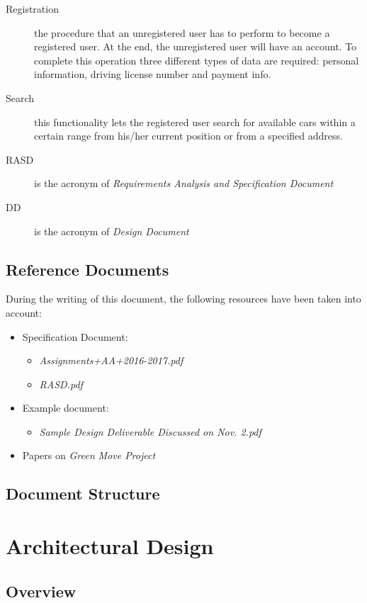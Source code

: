 \documentclass[11pt,a4paper]{report}
\begin{document}
\begin{description}
\item[Registration] the procedure that an unregistered user has to perform to become a registered user. At the end, the unregistered user will have an account. To complete this operation three different types of data are required: personal information, driving license number and payment info.
\item[Search] this functionality lets the registered user search for available cars within a certain range from his/her current position or from a specified address.
\item[RASD] is the acronym of \textit{Requirements Analysis and Specification Document}
\item[DD] is the acronym of \textit{Design Document}
\end{description}

\section{Reference Documents}
During the writing of this document, the following resources have been taken into account:
\begin{itemize}
	\item Specification Document:
	\begin{itemize}
		\item \textit{Assignments+AA+2016-2017.pdf}
		\item \textit{RASD.pdf}
	\end{itemize}
	\item Example document:
	\begin{itemize}
		\item \textit{Sample Design Deliverable Discussed on Nov. 2.pdf}
	\end{itemize}
	\item Papers on \textit{Green Move Project}
\end{itemize}
\section{Document Structure}

\chapter{Architectural Design}
\section{Overview}
\end{document}
